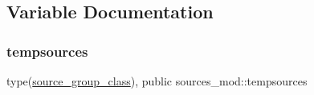 \subsection{Variable Documentation}
\mbox{\label{namespacesources__mod_ab04ea8c02cdf83a1a356c8710ae811d5}} 
\subsubsection{\texorpdfstring{tempsources}{tempsources}}
{\footnotesize\ttfamily type(\hyperlink{structsources__mod_1_1source__group__class}{source\+\_\+group\+\_\+class}), public sources\+\_\+mod\+::tempsources}

